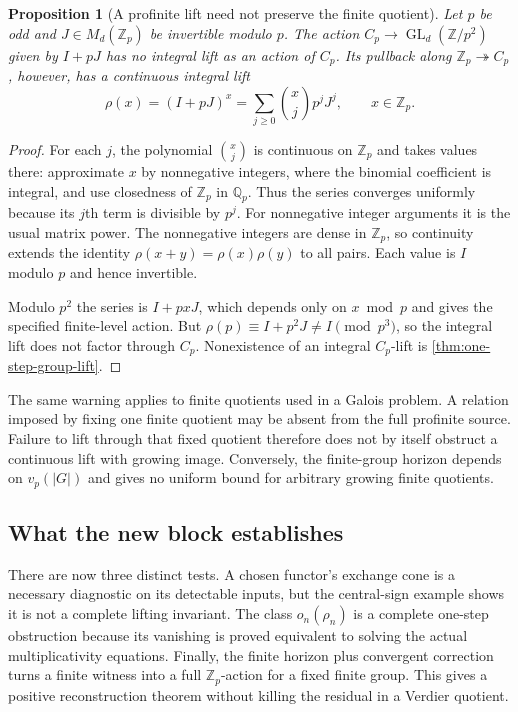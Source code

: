 \documentclass[11pt]{article}
\newtheorem{proposition}[theorem]{Proposition}
\theoremstyle{definition}
\theoremstyle{remark}
\begin{document}
\begin{proposition}[A profinite lift need not preserve the finite quotient]\label{prop:profinite-quotient-boundary}
Let $p$ be odd and $J\in M_d(\mathbb Z_p)$ be invertible modulo $p$. The action $C_p\to\operatorname{GL}_d(\mathbb Z/p^2)$ given by $I+pJ$ has no integral lift as an action of $C_p$. Its pullback along $\mathbb Z_p\twoheadrightarrow C_p$, however, has a continuous integral lift
\[
 \rho(x)=(I+pJ)^x
 =\sum_{j\geq0}\binom{x}{j}p^jJ^j,
 \qquad x\in\mathbb Z_p.
\]
\end{proposition}
\begin{proof}
For each $j$, the polynomial $\binom{x}{j}$ is continuous on $\mathbb Z_p$ and takes values there: approximate $x$ by nonnegative integers, where the binomial coefficient is integral, and use closedness of $\mathbb Z_p$ in $\mathbb Q_p$. Thus the series converges uniformly because its $j$th term is divisible by $p^j$. For nonnegative integer arguments it is the usual matrix power. The nonnegative integers are dense in $\mathbb Z_p$, so continuity extends the identity $\rho(x+y)=\rho(x)\rho(y)$ to all pairs. Each value is $I$ modulo $p$ and hence invertible.

Modulo $p^2$ the series is $I+pxJ$, which depends only on $x\bmod p$ and gives the specified finite-level action. But $\rho(p)\equiv I+p^2J\ne I\pmod{p^3}$, so the integral lift does not factor through $C_p$. Nonexistence of an integral $C_p$-lift is \cref{thm:one-step-group-lift}.
\end{proof}

The same warning applies to finite quotients used in a Galois problem. A relation imposed by fixing one finite quotient may be absent from the full profinite source. Failure to lift through that fixed quotient therefore does not by itself obstruct a continuous lift with growing image. Conversely, the finite-group horizon depends on $v_p(|G|)$ and gives no uniform bound for arbitrary growing finite quotients.

\subsection{What the new block establishes}

There are now three distinct tests. A chosen functor's exchange cone is a necessary diagnostic on its detectable inputs, but the central-sign example shows it is not a complete lifting invariant. The class $o_n(\rho_n)$ is a complete one-step obstruction because its vanishing is proved equivalent to solving the actual multiplicativity equations. Finally, the finite horizon plus convergent correction turns a finite witness into a full $\mathbb Z_p$-action for a fixed finite group. This gives a positive reconstruction theorem without killing the residual in a Verdier quotient.
\end{document}
